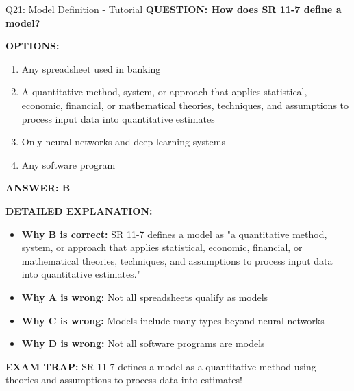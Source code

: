 \documentclass[8pt]{beamer}
\begin{document}
	\begin{frame}{Q21: Model Definition - Tutorial}
		\fontsize{6.5}{7.5}\selectfont
		\textbf{QUESTION: How does SR 11-7 define a model?}
		
		\vspace{0.1cm}
		\textbf{OPTIONS:}
		\begin{enumerate}
			\item Any spreadsheet used in banking
			\item A quantitative method, system, or approach that applies statistical, economic, financial, or mathematical theories, techniques, and assumptions to process input data into quantitative estimates
			\item Only neural networks and deep learning systems
			\item Any software program
		\end{enumerate}
		
		\vspace{0.1cm}
		\textcolor{myblue}{\textbf{ANSWER: B}}
		
		\vspace{0.1cm}
		\textbf{DETAILED EXPLANATION:}
		\begin{itemize}
			\item \textbf{Why B is correct:} SR 11-7 defines a model as "a quantitative method, system, or approach that applies statistical, economic, financial, or mathematical theories, techniques, and assumptions to process input data into quantitative estimates."
			\item \textbf{Why A is wrong:} Not all spreadsheets qualify as models
			\item \textbf{Why C is wrong:} Models include many types beyond neural networks
			\item \textbf{Why D is wrong:} Not all software programs are models
		\end{itemize}
		
		\textcolor{myred}{\textbf{EXAM TRAP:}} SR 11-7 defines a model as a \textcolor{myblue}{quantitative method using theories and assumptions to process data into estimates}!
	\end{frame}
	
\end{document}

